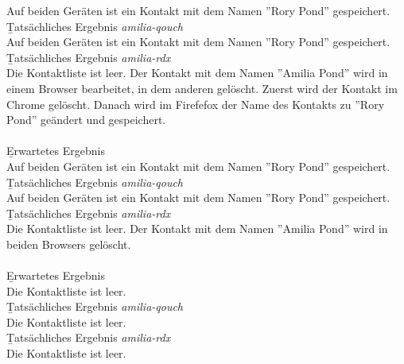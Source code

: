 Auf beiden Geräten ist ein Kontakt mit dem Namen ''Rory Pond'' gespeichert.\\
\b{Tatsächliches Ergebnis \it{amilia-qouch}}\\
Auf beiden Geräten ist ein Kontakt mit dem Namen ''Rory Pond'' gespeichert.\\
\b{Tatsächliches Ergebnis \it{amilia-rdx}}\\
Die Kontaktliste ist leer.
%
Der Kontakt mit dem Namen ''Amilia Pond'' wird in einem Browser bearbeitet, in dem anderen gelöscht.
Zuerst wird der Kontakt im Chrome gelöscht. 
Danach wird im Firefefox der Name des Kontakts zu ''Rory Pond'' geändert und gespeichert.\\\\
\b{Erwartetes Ergebnis}\\
Auf beiden Geräten ist ein Kontakt mit dem Namen ''Rory Pond'' gespeichert.\\
\b{Tatsächliches Ergebnis \it{amilia-qouch}}\\
Auf beiden Geräten ist ein Kontakt mit dem Namen ''Rory Pond'' gespeichert.\\
\b{Tatsächliches Ergebnis \it{amilia-rdx}}\\
Die Kontaktliste ist leer.
%
Der Kontakt mit dem Namen ''Amilia Pond'' wird in beiden Browsers gelöscht.\\\\
\b{Erwartetes Ergebnis}\\
Die Kontaktliste ist leer.\\
\b{Tatsächliches Ergebnis \it{amilia-qouch}}\\
Die Kontaktliste ist leer.\\
\b{Tatsächliches Ergebnis \it{amilia-rdx}}\\
Die Kontaktliste ist leer.